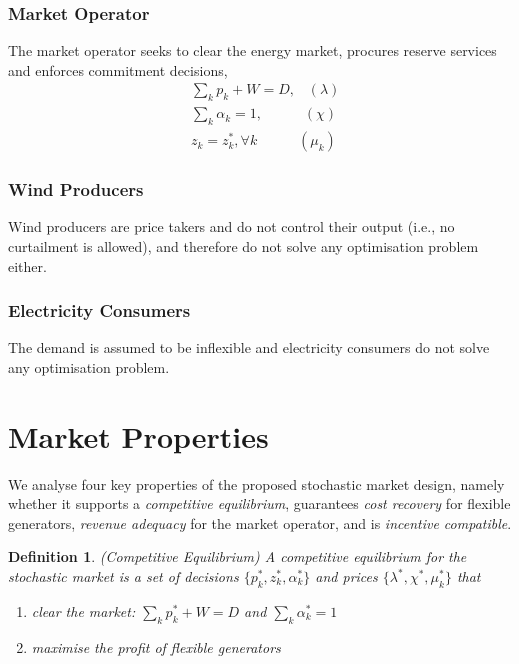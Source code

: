 \documentclass{article}
\newtheorem{definition}{Definition}
\begin{document}
\subsubsection{Market Operator}

The market operator seeks to clear the energy market, procures reserve services and enforces commitment decisions,
\begin{align}
& \sum_k p_k + W = D, \hspace{10pt} (\lambda)\\
& \sum_k \alpha_k = 1, \hspace{35pt} (\chi)\\
&z_k = z_k^*, \forall k \hspace{35pt} (\mu_k)
\end{align}

\subsubsection{Wind Producers}

Wind producers are price takers and do not control their output (i.e., no curtailment is allowed), and therefore do not solve any optimisation problem either.

\subsubsection{Electricity Consumers}

The demand is assumed to be inflexible and electricity consumers do not solve any optimisation problem.

\section{Market Properties}

We analyse four key properties of the proposed stochastic market design, namely whether it supports a \textit{competitive equilibrium}, guarantees \textit{cost recovery} for flexible generators, \textit{revenue adequacy} for the market operator, and is \textit{incentive compatible}.

\begin{definition}
(Competitive Equilibrium) A competitive equilibrium for the stochastic market is a set of decisions $\{p_k^*, z_k^*, \alpha_k^*\}$ and prices $\{\lambda^*, \chi^*, \mu_k^*\}$ that\vspace{-5pt}
\begin{enumerate}
\item clear the market: $\sum_k p_k^* + W = D$ and $\sum_k \alpha_k^* = 1$\vspace{-5pt}
\item maximise the profit of flexible generators
\end{enumerate}
\end{definition}
\end{document}
